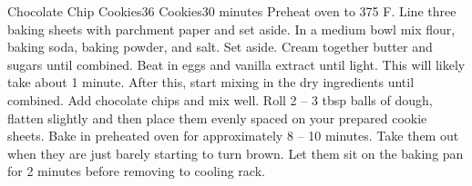 \documentclass[../main.tex]{subfiles}
\begin{document}
\begin{recipe}{Chocolate Chip Cookies}{36 Cookies}{30 minutes}
    Preheat oven to 375 \degrees{}F. Line three baking sheets with parchment
    paper and set aside.
    In a medium bowl mix flour, baking soda, baking powder, and salt. Set
    aside.
    Cream together butter and sugars until combined.
    Beat in eggs and vanilla extract until light. This will likely take about 1
    minute. After this, start mixing in the dry ingredients until combined.
    Add chocolate chips and mix well. Roll 2 -- 3 tbsp balls of dough, flatten
    slightly and then place them evenly spaced on your prepared cookie sheets.
    Bake in preheated oven for approximately 8 -- 10 minutes. Take them out
    when they are just barely starting to turn brown. Let them sit on the
    baking pan for 2 minutes before removing to cooling rack.

\end{recipe}
\end{document}

